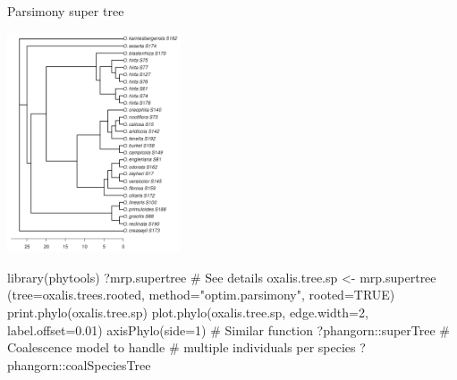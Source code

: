 \documentclass[compress, ucs, xelatex, 11pt, xcolor=svgnames, aspectratio=169,
	hyperref={
		bookmarks=true,
		unicode=true,
		colorlinks=true,
		pdftitle={Molecular data in R},
		plainpages=false,
		pdfauthor={Vojtech Zeisek},
		pdfsubject={Course about phylogeny and evolution in R},
		pdfcreator={XeLaTeX},
		pdfkeywords={R, evolution, phylogeny, molecular data},
		linkcolor=Crimson, %
		anchorcolor=Magenta, %
		citecolor=Magenta, %
		filecolor=Magenta, %
		menucolor=Magenta, %
		urlcolor=DodgerBlue, %
		pdftex},
	url={hyphens, lowtilde} %
	]{beamer}
\begin{document}
\begin{frame}[fragile]{Parsimony super tree}
	\begin{multicols}{2}
		\begin{center}
			\includegraphics[height=6.5cm]{oxalis-pars.png}
		\end{center}
		\begin{spluscode}
    library(phytools)
    ?mrp.supertree # See details
    oxalis.tree.sp <- mrp.supertree
      (tree=oxalis.trees.rooted,
      method="optim.parsimony",
      rooted=TRUE)
    print.phylo(oxalis.tree.sp)
    plot.phylo(oxalis.tree.sp,
      edge.width=2, label.offset=0.01)
    axisPhylo(side=1)
    # Similar function
    ?phangorn::superTree
    # Coalescence model to handle
    # multiple individuals per species
    ?phangorn::coalSpeciesTree
		\end{spluscode}
	\end{multicols}
\end{frame}

%
\end{document}
